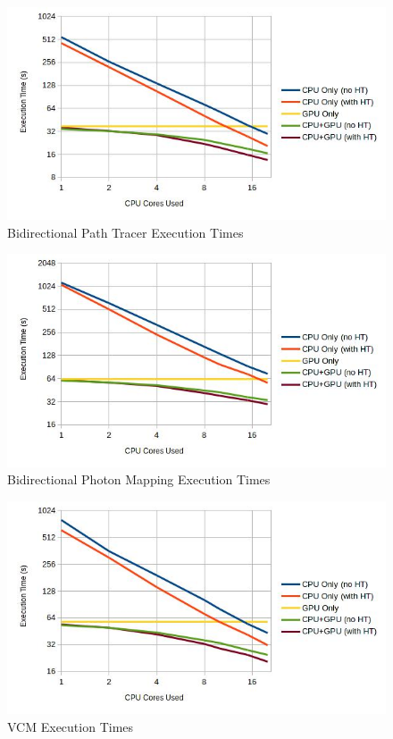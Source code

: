 \begin{figure}[H]
\centering
\includegraphics[width=0.8\linewidth]{img/bptTexec.jpg}
\caption{\label{img:bptTexec} Bidirectional Path Tracer Execution Times}
\end{figure}

\begin{figure}[H]
\centering
\includegraphics[width=0.8\linewidth]{img/bpmTexec.jpg}
\caption{\label{img:bpmTexec} Bidirectional Photon Mapping Execution Times}
\end{figure}

\begin{figure}[H]
\centering
\includegraphics[width=0.8\linewidth]{img/vcmTexec.jpg}
\caption{\label{img:vcmTexec} VCM Execution Times}
\end{figure}

